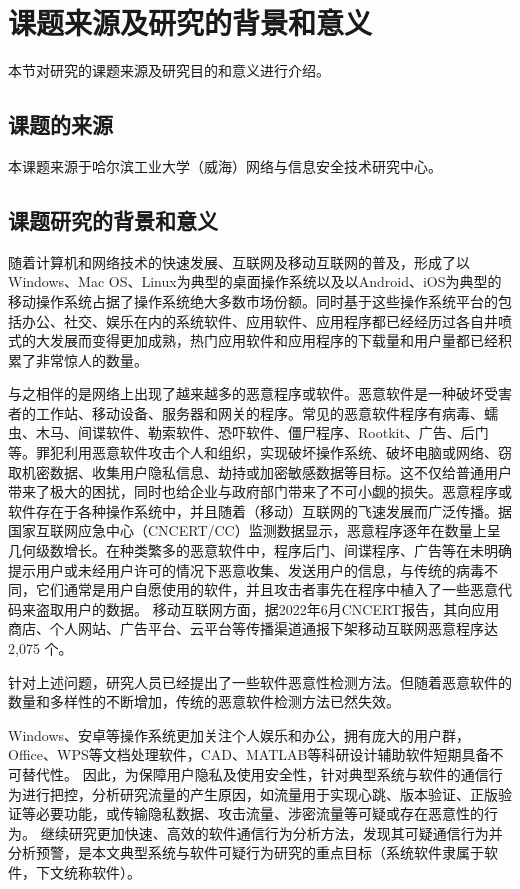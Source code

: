 
\section{课题来源及研究的背景和意义}
	本节对研究的课题来源及研究目的和意义进行介绍。
\subsection{课题的来源}
本课题来源于哈尔滨工业大学（威海）网络与信息安全技术研究中心。
\subsection{课题研究的背景和意义}
随着计算机和网络技术的快速发展、互联网及移动互联网的普及，形成了以Windows、Mac OS、Linux为典型的桌面操作系统以及以Android、iOS为典型的移动操作系统占据了操作系统绝大多数市场份额。同时基于这些操作系统平台的包括办公、社交、娱乐在内的系统软件、应用软件、应用程序都已经经历过各自井喷式的大发展而变得更加成熟，热门应用软件和应用程序的下载量和用户量都已经积累了非常惊人的数量。

与之相伴的是网络上出现了越来越多的恶意程序或软件。恶意软件是一种破坏受害者的工作站、移动设备、服务器和网关的程序。常见的恶意软件程序有病毒、蠕虫、木马、间谍软件、勒索软件、恐吓软件、僵尸程序、Rootkit、广告、后门等。罪犯利用恶意软件攻击个人和组织，实现破坏操作系统、破坏电脑或网络、窃取机密数据、收集用户隐私信息、劫持或加密敏感数据等目标。这不仅给普通用户带来了极大的困扰，同时也给企业与政府部门带来了不可小觑的损失。恶意程序或软件存在于各种操作系统中，并且随着（移动）互联网的飞速发展而广泛传播。据国家互联网应急中心（CNCERT/CC）监测数据显示，恶意程序逐年在数量上呈几何级数增长。在种类繁多的恶意软件中，程序后门、间谍程序、广告等在未明确提示用户或未经用户许可的情况下恶意收集、发送用户的信息，与传统的病毒不同，它们通常是用户自愿使用的软件，并且攻击者事先在程序中植入了一些恶意代码来盗取用户的数据。
移动互联网方面，据2022年6月CNCERT报告\cite{CNCERT2022}，其向应用商店、个人网站、广告平台、云平台等传播渠道通报下架移动互联网恶意程序达 2,075 个。
 
针对上述问题，研究人员已经提出了一些软件恶意性检测方法。但随着恶意软件的数量和多样性的不断增加，传统的恶意软件检测方法已然失效。

Windows、安卓等操作系统更加关注个人娱乐和办公，拥有庞大的用户群，Office、WPS等文档处理软件，CAD、MATLAB等科研设计辅助软件短期具备不可替代性。
因此，为保障用户隐私及使用安全性，针对典型系统与软件的通信行为进行把控，分析研究流量的产生原因，如流量用于实现心跳、版本验证、正版验证等必要功能，或传输隐私数据、攻击流量、涉密流量等可疑或存在恶意性的行为。
继续研究更加快速、高效的软件通信行为分析方法，发现其可疑通信行为并分析预警，是本文典型系统与软件可疑行为研究的重点目标（系统软件隶属于软件，下文统称软件）。

